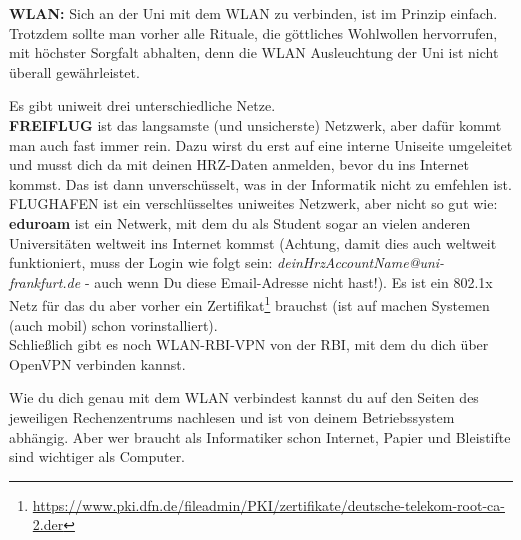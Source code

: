 \textbf{WLAN:}
Sich an der Uni mit dem WLAN zu verbinden, ist im Prinzip einfach.
Trotzdem sollte man vorher alle Rituale, die g\"ottliches Wohlwollen hervorrufen, mit h\"ochster Sorgfalt abhalten,
denn die WLAN Ausleuchtung der Uni ist nicht \"uberall gew\"ahrleistet.

Es gibt uniweit drei unterschiedliche Netze.\\
\textbf{FREIFLUG} ist das langsamste (und unsicherste) Netzwerk, aber daf\"ur kommt man auch fast immer rein. Dazu wirst du erst auf eine interne Uniseite umgeleitet und musst dich da mit deinen HRZ-Daten anmelden, bevor du ins Internet kommst. Das ist dann unversch\"usselt, was in der Informatik nicht zu emfehlen ist.\\
FLUGHAFEN ist ein verschl\"usseltes uniweites Netzwerk, aber nicht so gut wie:\\
\textbf{eduroam} ist ein Netwerk, mit dem du als Student sogar an vielen anderen Universit\"aten weltweit ins Internet kommst (Achtung, damit dies auch weltweit funktioniert, muss der Login wie folgt sein: \textit{{\leq}deinHrzAccountName{\geq}@uni-frankfurt.de} - auch wenn Du diese Email-Adresse nicht hast!).
Es ist ein 802.1x Netz f\"ur das du aber vorher ein Zertifikat\footnote{\url{https://www.pki.dfn.de/fileadmin/PKI/zertifikate/deutsche-telekom-root-ca-2.der}} brauchst (ist auf machen Systemen (auch mobil) schon vorinstalliert).\\
Schlie{\ss}lich gibt es noch WLAN-RBI-VPN von der RBI, mit dem du dich \"uber OpenVPN verbinden kannst.

Wie du dich genau mit dem WLAN verbindest kannst du auf den Seiten des jeweiligen Rechenzentrums nachlesen und ist von deinem Betriebssystem abh\"angig. Aber wer braucht als Informatiker schon Internet, Papier und Bleistifte sind wichtiger als Computer.






\spaltenende
